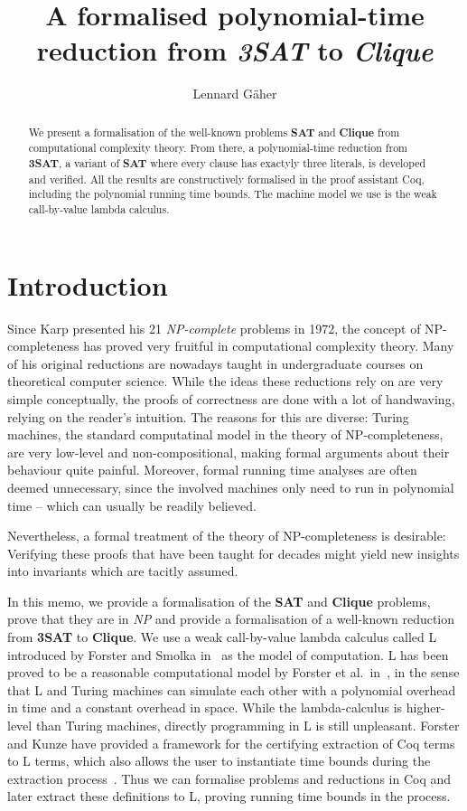 \documentclass[a4paper,UKenglish,cleveref, autoref]{lipics-v2019}
\title{A formalised polynomial-time reduction from \emph{3SAT} to \emph{Clique}} %
\author{Lennard Gäher}{Saarland University, Germany}{s8legaeh@stud.uni-saarland.de}{}{}%
\begin{document}
\maketitle

\begin{abstract}
  We present a formalisation of the well-known problems \textbf{SAT} and \textbf{Clique} from computational complexity theory. From there, a polynomial-time reduction from \textbf{3SAT}, a variant of \textbf{SAT} where every clause has exactyly three literals, is developed and verified. 
  All the results are constructively formalised in the proof assistant Coq, including the polynomial running time bounds. The machine model we use is the weak call-by-value lambda calculus. 
\end{abstract}

\section{Introduction}
Since Karp presented his 21 \emph{NP-complete} problems in 1972, the concept of NP-completeness has proved very fruitful in computational complexity theory. Many of his original reductions are nowadays taught in undergraduate courses on theoretical computer science. 
While the ideas these reductions rely on are very simple conceptually, the proofs of correctness are done with a lot of handwaving, relying on the reader's intuition. The reasons for this are diverse: Turing machines, the standard computatinal model in the theory of NP-completeness, are very low-level and non-compositional, making formal arguments about their behaviour quite painful. Moreover, formal running time analyses are often deemed unnecessary, since the involved machines only need to run in polynomial time -- which can usually be readily believed.

Nevertheless, a formal treatment of the theory of NP-completeness is desirable: Verifying these proofs that have been taught for decades might yield new insights into invariants which are tacitly assumed.

In this memo, we provide a formalisation of the \textbf{SAT} and \textbf{Clique} problems, prove that they are in \emph{NP} and provide a formalisation of a well-known reduction from \textbf{3SAT} to \textbf{Clique}. We use a weak call-by-value lambda calculus called L introduced by Forster and Smolka in~\cite{ForsterSmolka:2017:L-Computability} as the model of computation. L has been proved to be a reasonable computational model by Forster et al.\ in~\cite{ForsterKunzeRoth:2019:wcbv-Reasonable}, in the sense that L and Turing machines can simulate each other with a polynomial overhead in time and a constant overhead in space. 
While the lambda-calculus is higher-level than Turing machines, directly programming in L is still unpleasant. Forster and Kunze have provided a framework for the certifying extraction of Coq terms to L terms, which also allows the user to instantiate time bounds during the extraction process~\cite{ForsterKunze:2019:Certifying-extraction}. Thus we can formalise problems and reductions in Coq and later extract these definitions to L, proving running time bounds in the process.
\end{document}
